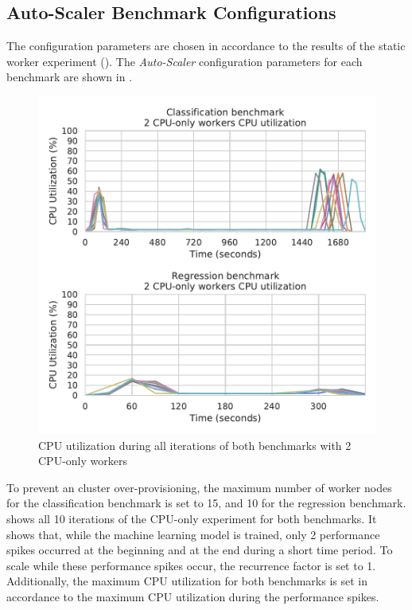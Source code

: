 \subsection{Auto-Scaler Benchmark Configurations}
The configuration parameters are chosen in accordance to the results of the static worker experiment ().
The \textit{Auto-Scaler} configuration parameters for each benchmark are shown in .
\begin{figure}[h]
\centering
\includegraphics[scale=0.9]{images/07_evaluation/overall_auto-scaler_iterations}
\caption{CPU utilization during all iterations of both benchmarks with 2 CPU-only workers}
\label{fig:07_auto-scaler_iterations_results}
\end{figure}
To prevent an cluster over-provisioning, the maximum number of worker nodes for the classification benchmark is set to 15, and 10 for the regression benchmark.
 shows all 10 iterations of the CPU-only experiment for both benchmarks. It shows that, while the machine learning model is trained, only 2 performance spikes occurred at the beginning and at the end during a short time period. To scale while these performance spikes occur, the recurrence factor is set to 1. Additionally, the maximum CPU utilization for both benchmarks is set in accordance to the maximum CPU utilization during the performance spikes.
